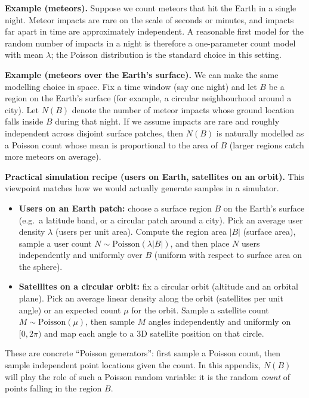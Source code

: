 \noindent\textbf{Example (meteors).} Suppose we count meteors that hit the Earth in a single night. Meteor impacts are rare
on the scale of seconds or minutes, and impacts far apart in time are approximately independent. A reasonable first model
for the random number of impacts in a night is therefore a one-parameter count model with mean $\lambda$; the Poisson
distribution is the standard choice in this setting.

\noindent\textbf{Example (meteors over the Earth's surface).} We can make the same modelling choice in space. Fix a time
window (say one night) and let $B$ be a region on the Earth's surface (for example, a circular neighbourhood around a
city). Let $N(B)$ denote the number of meteor impacts whose ground location falls inside $B$ during that night. If we
assume impacts are rare and roughly independent across disjoint surface patches, then $N(B)$ is naturally modelled as a
Poisson count whose mean is proportional to the area of $B$ (larger regions catch more meteors on average).

\noindent\textbf{Practical simulation recipe (users on Earth, satellites on an orbit).}
This viewpoint matches how we would actually generate samples in a simulator.
\begin{itemize}
    \item \textbf{Users on an Earth patch:} choose a surface region $B$ on the Earth's surface (e.g.\ a latitude band, or a
    circular patch around a city). Pick an average user density $\lambda$ (users per unit area). Compute the region area
    $|B|$ (surface area), sample a user count $N\sim\mathrm{Poisson}(\lambda|B|)$, and then place $N$ users independently
    and uniformly over $B$ (uniform with respect to surface area on the sphere).
    \item \textbf{Satellites on a circular orbit:} fix a circular orbit (altitude and an orbital plane). Pick an average
    linear density along the orbit (satellites per unit angle) or an expected count $\mu$ for the orbit. Sample a satellite
    count $M\sim\mathrm{Poisson}(\mu)$, then sample $M$ angles independently and uniformly on $[0,2\pi)$ and map each angle
    to a 3D satellite position on that circle.
\end{itemize}
These are concrete ``Poisson generators'': first sample a Poisson count, then sample independent point locations given the
count.
In this appendix, $N(B)$ will play the role of such a Poisson random variable: it is the random \emph{count} of points
falling in the region $B$.


